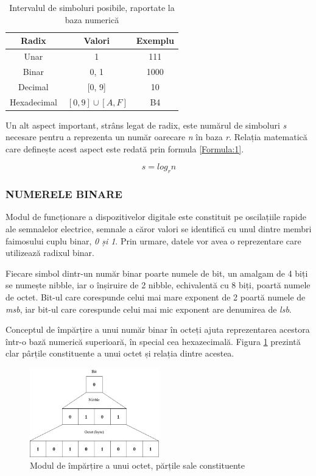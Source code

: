 \documentclass[12pt]{article}
\begin{document}
\begin{table}[h]
\centering
\caption{Intervalul de simboluri posibile, raportate la baza numerică }
\label{Tabela:1}
\begin{tabular}{ ||c|c|c|| }
 \hline
 Radix & Valori & Exemplu \\ 
 \hline  \hline
 Unar & 1 & 111\\
 \hline
 Binar & 0, 1 & 1000\\ 
 \hline
 Decimal & [0, 9]  & 10\\ 
 \hline 
 Hexadecimal & $\ [0, 9] \cup [A, F]$ & B4\\ 
 \hline
\end{tabular}
\end{table}

Un alt aspect important, strâns legat de radix, este numărul de simboluri \textit{s} necesare pentru a reprezenta un număr oarecare \textit{n} în baza \textit{r}. Relația matematică care definește acest aspect este redată prin formula \ref{Formula:1}.

\begin{equation}
\label{Formula:1}
s = log_r n
\end{equation}


\subsubsection{NUMERELE BINARE}
Modul de funcționare a dispozitivelor digitale  este constituit pe oscilațiile rapide ale semnalelor electrice, semnale a căror valori se identifică cu unul dintre membri faimosului cuplu binar, \textit{0 și 1}. Prin urmare, datele vor avea o reprezentare care utilizează radixul binar. 

Fiecare simbol dintr-un număr binar poarte numele de bit, un amalgam de 4 biți se numește nibble, iar o înșiruire de 2 nibble, echivalentă cu 8 biți, poartă numele de octet. Bit-ul care corespunde celui mai mare exponent de 2 poartă numele de \textit{msb}, iar bit-ul care corespunde celui mai mic exponent are denumirea de \textit{lsb}.

Conceptul de împărțire a unui număr binar în octeți ajuta reprezentarea acestora într-o bază numerică superioară, în special cea hexazecimală. Figura \ref{Figura:1} prezintă clar pârțile constituente a unui octet și relația dintre acestea.

 \begin{figure}[h!]
 \includegraphics[width=0.5\textwidth]{byte.png}
 \centering
 \caption{Modul de împărțire a unui octet, părțile sale constituente}
 \label{Figura:1}
 \end{figure}
\end{document}
